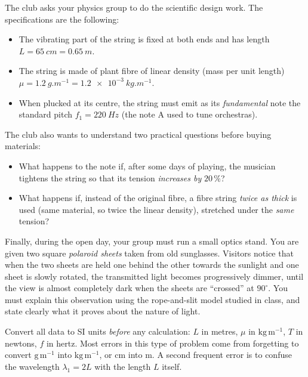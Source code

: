 \documentclass[11pt]{article}
\begin{document}
The club asks your physics group to do the scientific design work. The specifications are the following:

\begin{itemize}
\item The vibrating part of the string is fixed at both ends and has length $L=\SI{65}{cm}=\SI{0.65}{m}$.
\item The string is made of plant fibre of linear density (mass per unit length) $\mu=\SI{1.2}{g.m^{-1}}=\SI{1.2e-3}{kg.m^{-1}}$.
\item When plucked at its centre, the string must emit as its \emph{fundamental} note the standard pitch $f_1=\SI{220}{Hz}$ (the note A used to tune orchestras).
\end{itemize}

The club also wants to understand two practical questions before buying materials:

\begin{itemize}
\item What happens to the note if, after some days of playing, the musician tightens the string so that its tension \emph{increases by} $20\,\%$?
\item What happens if, instead of the original fibre, a fibre string \emph{twice as thick} is used (same material, so twice the linear density), stretched under the \emph{same} tension?
\end{itemize}

Finally, during the open day, your group must run a small optics stand. You are given two square \emph{polaroid sheets} taken from old sunglasses. Visitors notice that when the two sheets are held one behind the other towards the sunlight and one sheet is slowly rotated, the transmitted light becomes progressively dimmer, until the view is almost completely dark when the sheets are ``crossed'' at $90^{\circ}$. You must explain this observation using the rope-and-slit model studied in class, and state clearly what it proves about the nature of light.

\begin{attention}
Convert all data to SI units \emph{before} any calculation: $L$ in metres, $\mu$ in $\mathrm{kg\,m^{-1}}$, $T$ in newtons, $f$ in hertz. Most errors in this type of problem come from forgetting to convert $\mathrm{g\,m^{-1}}$ into $\mathrm{kg\,m^{-1}}$, or $\mathrm{cm}$ into $\mathrm{m}$. A second frequent error is to confuse the wavelength $\lambda_1=2L$ with the length $L$ itself.
\end{attention}
\end{document}
